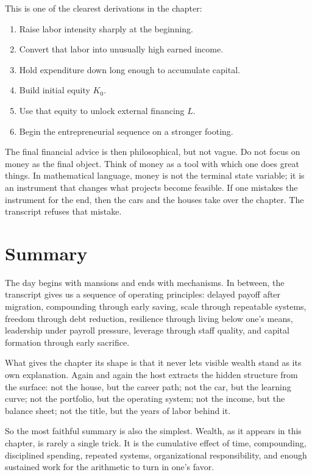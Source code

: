 This is one of the clearest derivations in the chapter:
\begin{enumerate}
\item Raise labor intensity sharply at the beginning.
\item Convert that labor into unusually high earned income.
\item Hold expenditure down long enough to accumulate capital.
\item Build initial equity \(K_0\).
\item Use that equity to unlock external financing \(L\).
\item Begin the entrepreneurial sequence on a stronger footing.
\end{enumerate}

The final financial advice is then philosophical, but not vague. Do not focus on money as the final object. Think of money as a tool with which one does great things. In mathematical language, money is not the terminal state variable; it is an instrument that changes what projects become feasible. If one mistakes the instrument for the end, then the cars and the houses take over the chapter. The transcript refuses that mistake.

\section{Summary}

The day begins with mansions and ends with mechanisms. In between, the transcript gives us a sequence of operating principles: delayed payoff after migration, compounding through early saving, scale through repeatable systems, freedom through debt reduction, resilience through living below one's means, leadership under payroll pressure, leverage through staff quality, and capital formation through early sacrifice.

What gives the chapter its shape is that it never lets visible wealth stand as its own explanation. Again and again the host extracts the hidden structure from the surface: not the house, but the career path; not the car, but the learning curve; not the portfolio, but the operating system; not the income, but the balance sheet; not the title, but the years of labor behind it.

So the most faithful summary is also the simplest. Wealth, as it appears in this chapter, is rarely a single trick. It is the cumulative effect of time, compounding, disciplined spending, repeated systems, organizational responsibility, and enough sustained work for the arithmetic to turn in one's favor.